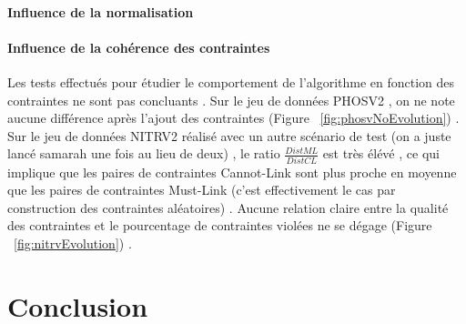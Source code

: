 \documentclass[11pt, openany]{report}
\begin{document}
\subsubsection{Influence de la normalisation}
\setlength{\parindent}{0in}


\subsubsection{Influence de la cohérence des contraintes}
\setlength{\parindent}{0in}
Les tests effectués pour étudier le comportement de l'algorithme en fonction des contraintes ne sont pas concluants . Sur le jeu de données PHOSV2 , on ne note aucune différence après l'ajout des contraintes (Figure  ~\ref{fig:phosvNoEvolution}) . \\
Sur le jeu  de données NITRV2 réalisé avec un autre scénario de test (on a juste lancé samarah une fois au lieu de deux) , le ratio $\frac{DistML}{DistCL}$ est très élévé , ce qui implique que les paires de contraintes Cannot-Link sont plus proche en moyenne que les paires de contraintes Must-Link (c'est effectivement le cas par construction des contraintes aléatoires) . Aucune relation claire  entre la qualité des contraintes et le pourcentage de contraintes violées ne se dégage (Figure ~\ref{fig:nitrvEvolution}) .
\newline
\newline
\chapter{Conclusion}
\setlength{\parindent}{2em}
\end{document}
